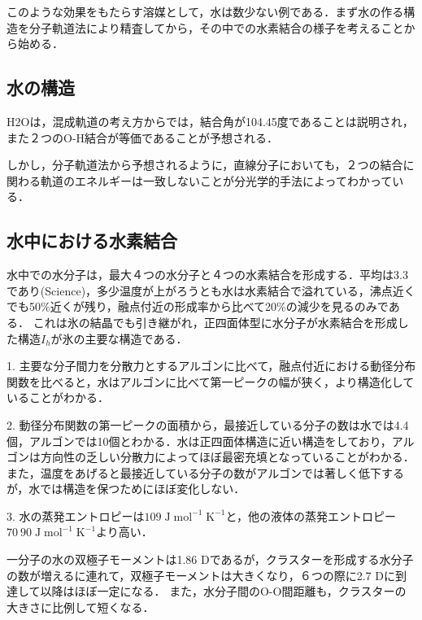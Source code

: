\documentclass[uplatex, dvipdfmx]{jsreport}
\begin{document}
このような効果をもたらす溶媒として，水は数少ない例である．まず水の作る構造を分子軌道法により精査してから，その中での水素結合の様子を考えることから始める．

\subsection{水の構造}

H2Oは，混成軌道の考え方からでは，結合角が104.45度であることは説明され，また２つのO-H結合が等価であることが予想される．

しかし，分子軌道法から予想されるように，直線分子においても，２つの結合に関わる軌道のエネルギーは一致しないことが分光学的手法によってわかっている．

\begin{theory}
    
\end{theory}

\subsection{水中における水素結合}

水中での水分子は，最大４つの水分子と４つの水素結合を形成する．平均は3.3であり(Science)，多少温度が上がろうとも水は水素結合で溢れている，沸点近くでも50\%近くが残り，融点付近の形成率から比べて20\%の減少を見るのみである．
これは氷の結晶でも引き継がれ，正四面体型に水分子が水素結合を形成した構造$I_h$が氷の主要な構造である．
\begin{fact}
    1. 主要な分子間力を分散力とするアルゴンに比べて，融点付近における動径分布関数を比べると，水はアルゴンに比べて第一ピークの幅が狭く，より構造化していることがわかる．

    2. 動径分布関数の第一ピークの面積から，最接近している分子の数は水では4.4個，アルゴンでは10個とわかる．水は正四面体構造に近い構造をしており，アルゴンは方向性の乏しい分散力によってほぼ最密充填となっていることがわかる．また，温度をあげると最接近している分子の数がアルゴンでは著しく低下するが，水では構造を保つためにほぼ変化しない．

    3. 水の蒸発エントロピーは$109\;\mathrm{J\; mol^{-1}\; K^{-1}}$と，他の液体の蒸発エントロピー$70~90\;\mathrm{J\; mol^{-1}\; K^{-1}}$より高い．
\end{fact}

一分子の水の双極子モーメントは1.86 Dであるが，クラスターを形成する水分子の数が増えるに連れて，双極子モーメントは大きくなり，６つの際に2.7 Dに到達して以降はほぼ一定になる．
また，水分子間のO-O間距離も，クラスターの大きさに比例して短くなる．
\end{document}
